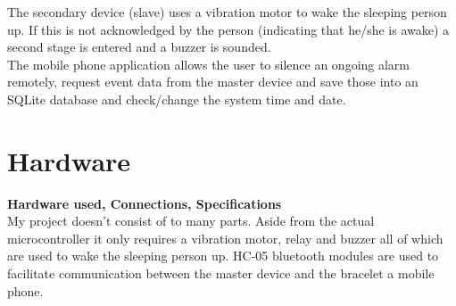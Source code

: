 \documentclass[12pt,a4paper]{article}
\begin{document}
	The secondary device (slave) uses a vibration motor to wake the sleeping person up. If this is 
	not acknowledged by the person (indicating that he/she is awake) a second stage is entered and 
	a buzzer is sounded.\\
	
	The mobile phone application allows the user to silence an ongoing alarm remotely, request 
	event data from the master device and save those into an SQLite database and check/change the 
	system time and date.\\
	\newpage
	
	\section{Hardware}
	{\bfseries Hardware used, Connections, Specifications}\\
	
	My project doesn't consist of to many parts. Aside from the actual microcontroller it only 
	requires a vibration motor, relay and buzzer all of which are used to wake the sleeping person  
	up. HC-05 bluetooth modules are used to facilitate communication between the master device and  
	the bracelet a mobile phone.
\end{document}
